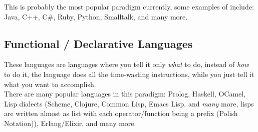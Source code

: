 \documentclass{article}
\begin{document}
This is probably the most popular paradigm currently, some examples of include: Java, C++, C\#, Ruby, Python, Smalltalk, and many more.
\subsection[Declarative]{Functional / Declarative Languages}
These languages are languages where you tell it only \emph{what} to do, instead of \emph{how} to do it, the language does all the time-wasting instructions, while you just tell it what you want to accomplish.\\

There are many popular languages in this paradigm: Prolog, Haskell, OCamel, Lisp dialects (Scheme, Clojure,  Common Lisp, Emacs Lisp, and \emph{many} more, lisps are written almost as list with each operator/function being a prefix (Polish Notation)), Erlang/Elixir, and many more.
\end{document}
